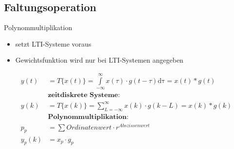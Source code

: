 \subsection*{Faltungsoperation}
Polynommultiplikation
\begin{itemize}
  \item setzt LTI-Systeme voraus
  \item Gewichtsfunktion wird nur bei LTI-Systemen angegeben
\end{itemize}

\begin{align*}
	y\left( t \right) &= T \{ x\left(t\right) \}  = \int\limits_{-\infty}^{\infty}
	x\left(\tau\right) \cdot g\left(t-\tau\right) \mathrm{d\tau} = x\left(t\right) \ast g\left(t\right)
	\\
	&\textbf{zeitdiskrete Systeme:}
	\\
	y\left( k \right) &= T \{ x\left(k\right) \}  = \sum\limits_{L = -\infty}^{\infty}
	x\left(k\right) \cdot g\left(k-L\right) = x\left(k\right) \ast g\left(k\right)
	\\
	&\textbf{Polynommultiplikation:}
	\\
	p_p &= \sum Ordinatenwert \cdot r^{Abszissenwert}
	\\
	y_p \left(k\right) &= x_p \cdot g_p
\end{align*}